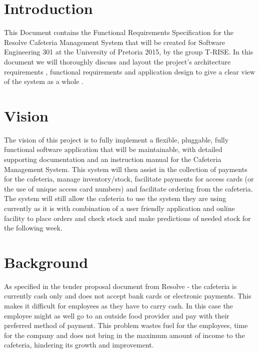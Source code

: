 \documentclass[12pt]{article}
\begin{document}
\maketitle
\break

\tableofcontents
\break


\section{Introduction}
This Document contains the Functional Requirements Specification for the Resolve Cafeteria Management System that will be created for Software Engineering 301 at the University of Pretoria 2015, by the group T-RISE. In this document we will thoroughly discuss and layout the project's architecture requirements , functional requirements and application design to give a clear view of the system as a whole . 

\section{Vision}
The vision of this project is to fully implement a flexible, pluggable, fully functional software application that will be maintainable, with detailed supporting documentation and an instruction manual for the Cafeteria Management System. This system will then assist in the collection of payments for the cafeteria, manage inventory/stock, facilitate payments for access cards (or the use of unique access card numbers) and facilitate ordering from the cafeteria. The system will still allow the cafeteria to use the system they are using currently as it is with combination of a user friendly application and online facility to place orders and check stock and make predictions of needed stock for the following week.

\section{Background}
As specified in the tender proposal document from Resolve - the cafeteria is currently cash only and does not accept bank cards or electronic payments. This makes it difficult for employees as they have to carry cash. In this case the employee might as well go to an outside food provider and
pay with their preferred method of payment. This problem wastes fuel for the employees, time for the company and does not bring in the maximum amount of income to the cafeteria, hindering its growth and improvement.\\
\end{document}
